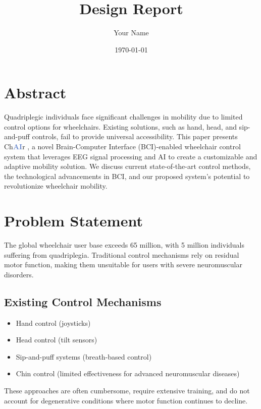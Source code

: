 \documentclass[a4paper]{article}
\title{Design Report}
\author{Your Name}
\date{\today}
\makeatletter
\newcommand\chair{%
  Ch\textcolor[HTML]{6B8ACD}{\textbf{AI}}r
  \@}
\makeatother
\begin{document}
\begin{titlepage}
    \maketitle
    \vspace{2cm}
    \tableofcontents
\end{titlepage}

\section{Abstract}

Quadriplegic individuals face significant challenges in mobility due to limited control options for wheelchairs. Existing solutions, such as hand, head, and sip-and-puff controls, fail to provide universal accessibility. This paper presents \chair, a novel Brain-Computer Interface (BCI)-enabled wheelchair control system that leverages EEG signal processing and AI to create a customizable and adaptive mobility solution. We discuss current state-of-the-art control methods, the technological advancements in BCI, and our proposed system's potential to revolutionize wheelchair mobility.

\section{Problem Statement}

The global wheelchair user base exceeds 65 million, with 5 million individuals suffering from quadriplegia. Traditional control mechanisms rely on residual motor function, making them unsuitable for users with severe neuromuscular disorders. 

\subsection{Existing Control Mechanisms}
\begin{itemize}
    \item Hand control (joysticks)
    \item Head control (tilt sensors)
    \item Sip-and-puff systems (breath-based control)
    \item Chin control (limited effectiveness for advanced neuromuscular diseases)
\end{itemize}

These approaches are often cumbersome, require extensive training, and do not account for degenerative conditions where motor function continues to decline.
\end{document}

